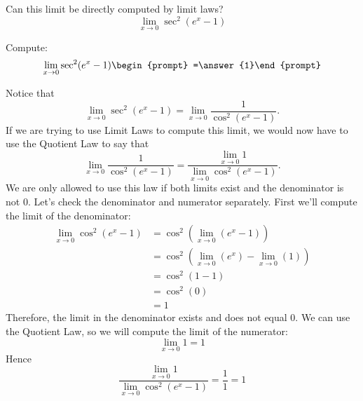 \documentclass{ximera}
\begin{document}
\begin{question}
  Can this limit be directly computed by limit laws?
  \[
  \lim_{x\to 0}\sec^2(e^x-1)
  \]
  \begin{multipleChoice}
  \end{multipleChoice}
  \begin{question}
    Compute:
    \[
    \lim_{x\to 0}\sec^2(e^x-1)\begin{prompt} =\answer{1}\end{prompt}
    \]
    \begin{feedback}
      Notice that
      \[
      \lim_{x\to 0} \sec^2(e^x-1) = \lim_{x\to 0} \frac{1}{\cos^2(e^x-1)}.
      \]
      If we are trying to use Limit Laws to compute this limit, we
      would now have to use the Quotient Law to say that
      \[
      \lim_{x\to 0} \frac{1}{\cos^2(e^x-1)} = \frac{ \lim_{x\to 0}1}{
        \lim_{x\to 0}\cos^2(e^x-1)}.
      \]
      We are only allowed to use this law if both limits exist and the
      denominator is not $0$.  Let's check the denominator and numerator
      separately. First we'll compute the limit of the denominator:
      \begin{align*}
        \lim_{x\to 0}\cos^2(e^x-1) &= \cos^2(\lim_{x\to 0}(e^x-1))\\
        &=\cos^2(\lim_{x\to 0}(e^x)-\lim_{x\to 0}(1))\\
        &=\cos^2(1-1)\\
        &= \cos^2(0)\\
        &=1
      \end{align*}
      Therefore, the limit in the denominator exists and does not
      equal $0$. We can use the Quotient Law, so we will compute the limit of the numerator:
      \[
      \lim_{x\to 0}1=1
      \]
      Hence
      \[
      \frac{ \lim_{x\to 0}1}{ \lim_{x\to 0}\cos^2(e^x-1)} =
      \frac{1}{1}=1
      \]
    \end{feedback}
  \end{question}
\end{question}
\end{document}
